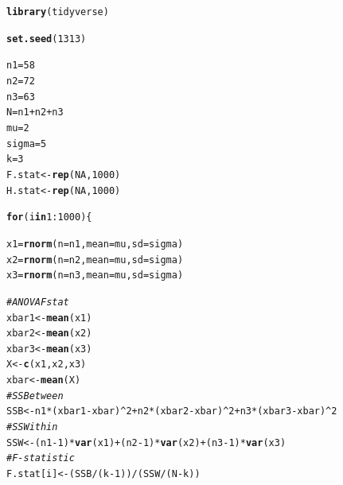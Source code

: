 \documentclass{article}\usepackage[]{graphicx}\usepackage[]{xcolor}
\makeatletter
\newcommand{\hlnum}[1]{\textcolor[rgb]{0.686,0.059,0.569}{#1}}%
\newcommand{\hlcom}[1]{\textcolor[rgb]{0.678,0.584,0.686}{\textit{#1}}}%
\newcommand{\hlopt}[1]{\textcolor[rgb]{0,0,0}{#1}}%
\newcommand{\hldef}[1]{\textcolor[rgb]{0.345,0.345,0.345}{#1}}%
\newcommand{\hlkwa}[1]{\textcolor[rgb]{0.161,0.373,0.58}{\textbf{#1}}}%
\newcommand{\hlkwb}[1]{\textcolor[rgb]{0.69,0.353,0.396}{#1}}%
\newcommand{\hlkwc}[1]{\textcolor[rgb]{0.333,0.667,0.333}{#1}}%
\newcommand{\hlkwd}[1]{\textcolor[rgb]{0.737,0.353,0.396}{\textbf{#1}}}%
\newenvironment{kframe}{%
 \def\at@end@of@kframe{}%
 \ifinner\ifhmode%
  \def\at@end@of@kframe{\end{minipage}}%
  \begin{minipage}{\columnwidth}%
 \fi\fi%
 \def\FrameCommand##1{\hskip\@totalleftmargin \hskip-\fboxsep
 \colorbox{shadecolor}{##1}\hskip-\fboxsep
     \hskip-\linewidth \hskip-\@totalleftmargin \hskip\columnwidth}%
 \MakeFramed {\advance\hsize-\width
   \@totalleftmargin\z@ \linewidth\hsize
   \@setminipage}}%
 {\par\unskip\endMakeFramed%
 \at@end@of@kframe}
\newenvironment{knitrout}{}{} %
\makeatother
\begin{document}
\begin{enumerate}
\begin{knitrout}\scriptsize
{}\color{fgcolor}\begin{kframe}
\begin{alltt}
\hlkwd{library}\hldef{(tidyverse)}

\hlkwd{set.seed}\hldef{(}\hlnum{1313}\hldef{)}

\hldef{n1} \hlkwb{=} \hlnum{58}
\hldef{n2} \hlkwb{=} \hlnum{72}
\hldef{n3} \hlkwb{=} \hlnum{63}
\hldef{N} \hlkwb{=} \hldef{n1} \hlopt{+} \hldef{n2} \hlopt{+} \hldef{n3}
\hldef{mu} \hlkwb{=} \hlnum{2}
\hldef{sigma} \hlkwb{=} \hlnum{5}
\hldef{k} \hlkwb{=} \hlnum{3}
\hldef{F.stat} \hlkwb{<-} \hlkwd{rep}\hldef{(}\hlnum{NA}\hldef{,} \hlnum{1000}\hldef{)}
\hldef{H.stat} \hlkwb{<-} \hlkwd{rep}\hldef{(}\hlnum{NA}\hldef{,} \hlnum{1000}\hldef{)}

\hlkwa{for} \hldef{(i} \hlkwa{in} \hlnum{1}\hlopt{:}\hlnum{1000}\hldef{)\{}

  \hldef{x1} \hlkwb{=} \hlkwd{rnorm}\hldef{(}\hlkwc{n} \hldef{= n1,} \hlkwc{mean} \hldef{= mu,} \hlkwc{sd} \hldef{= sigma)}
  \hldef{x2} \hlkwb{=} \hlkwd{rnorm}\hldef{(}\hlkwc{n} \hldef{= n2,} \hlkwc{mean} \hldef{= mu,} \hlkwc{sd} \hldef{= sigma)}
  \hldef{x3} \hlkwb{=} \hlkwd{rnorm}\hldef{(}\hlkwc{n} \hldef{= n3,} \hlkwc{mean} \hldef{= mu,} \hlkwc{sd} \hldef{= sigma)}

  \hlcom{# ANOVA F stat}
  \hldef{xbar1} \hlkwb{<-} \hlkwd{mean}\hldef{(x1)}
  \hldef{xbar2} \hlkwb{<-} \hlkwd{mean}\hldef{(x2)}
  \hldef{xbar3} \hlkwb{<-} \hlkwd{mean}\hldef{(x3)}
  \hldef{X} \hlkwb{<-} \hlkwd{c}\hldef{(x1, x2, x3)}
  \hldef{xbar} \hlkwb{<-} \hlkwd{mean}\hldef{(X)}
  \hlcom{# SSBetween}
  \hldef{SSB} \hlkwb{<-} \hldef{n1}\hlopt{*}\hldef{(xbar1}\hlopt{-}\hldef{xbar)}\hlopt{^}\hlnum{2} \hlopt{+} \hldef{n2}\hlopt{*}\hldef{(xbar2}\hlopt{-}\hldef{xbar)}\hlopt{^}\hlnum{2} \hlopt{+} \hldef{n3}\hlopt{*}\hldef{(xbar3}\hlopt{-}\hldef{xbar)}\hlopt{^}\hlnum{2}
  \hlcom{# SSWithin}
  \hldef{SSW} \hlkwb{<-} \hldef{(n1}\hlopt{-}\hlnum{1}\hldef{)}\hlopt{*}\hlkwd{var}\hldef{(x1)} \hlopt{+} \hldef{(n2}\hlopt{-}\hlnum{1}\hldef{)}\hlopt{*}\hlkwd{var}\hldef{(x2)} \hlopt{+} \hldef{(n3}\hlopt{-}\hlnum{1}\hldef{)}\hlopt{*}\hlkwd{var}\hldef{(x3)}
  \hlcom{# F-statistic}
  \hldef{F.stat[i]} \hlkwb{<-} \hldef{(SSB}\hlopt{/}\hldef{(k}\hlopt{-}\hlnum{1}\hldef{))}\hlopt{/}\hldef{(SSW}\hlopt{/}\hldef{(N}\hlopt{-}\hldef{k))}


\end{alltt}
\end{kframe}
\end{knitrout}
\end{enumerate}
\end{document}
